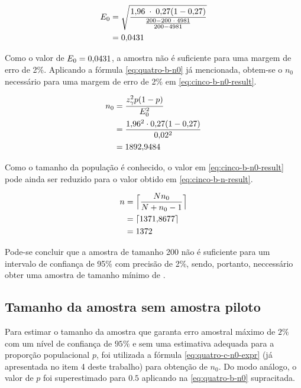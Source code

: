 	\begin{align}
		\label{eq:cinco-b-e0-calc}
		E_0 &= \sqrt{\frac{\num{1.96} \;\cdot\; \num{0.27} (1 - \num{0.27}) }{\frac{200 - 200 \;\cdot\; 4981}{200 - 4981}}} \\
			&= \num{0.0431} \nonumber
	\end{align}

	Como o valor de $E_0 = \num{0.0431}$, a amostra não é suficiente para uma
	margem de erro de 2\%. Aplicando a fórmula \eqref{eq:quatro-b-n0} já
	mencionada, obtem-se o $n_0$ necessário para uma margem de erro de 2\%
	em \eqref{eq:cinco-b-n0-result}.

	\begin{align}
		n_0 &= \frac{z_\gamma^2 p(1-p)}{E_0^2} \nonumber \\
			&= \frac{\num{1.96}^2 \cdot \num{0.27}(1-\num{0.27})}{\num{0.02}^2} \nonumber \\
			&= \label{eq:cinco-b-n0-result}
			   \num{1892.9484}	
	\end{align}

	Como o tamanho da população é conhecido, o valor em
	\eqref{eq:cinco-b-n0-result} pode ainda ser reduzido para o valor obtido
	em \eqref{eq:cinco-b-n-result}.

	\begin{align}
		n &= \Big\lceil \frac{N n_0}{N + n_0 - 1} \nonumber \Big\rceil \\
		  &= \lceil \num{1371.8677} \nonumber \rceil \\
		  &= \label{eq:cinco-b-n-result} 
			 1372
	\end{align}

	Pode-se concluir que a amostra de tamanho 200 não é suficiente para um
	intervalo de confiança de 95\% com precisão de 2\%, sendo, portanto,
	neccessário obter uma amostra de tamanho mínimo de \CINCOBnceil.

\subsection{Tamanho da amostra sem amostra piloto}

	Para estimar o tamanho da amostra que garanta erro amostral máximo de
	$2\%$ com um nível de confiança de $95\%$ e sem uma estimativa adequada
	para a proporção populacional $p$, foi utilizada a fórmula
	\eqref{eq:quatro-c-n0-expr} (já apresentada no item 4 deste trabalho)
	para obtenção de $n_0$.  Do modo análogo, o valor de $p$ foi
	superestimado para $\num{0.5}$ aplicando na \autoref{eq:quatro-b-n0}
	supracitada.

